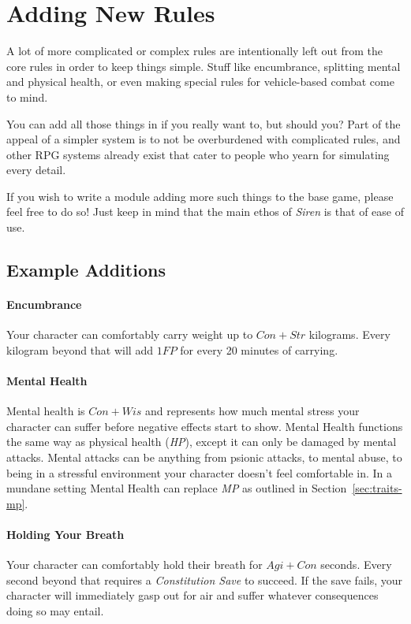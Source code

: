\section{Adding New Rules}\label{sec:hacking-rules}
A lot of more complicated or complex rules are intentionally left out from the core rules in order to keep things simple.
Stuff like encumbrance, splitting mental and physical health, or even making special rules for vehicle-based combat come to mind.

You can add all those things in if you really want to, but should you?
Part of the appeal of a simpler system is to not be overburdened with complicated rules, and other RPG systems already exist that cater to people who yearn for simulating every detail.

If you wish to write a module adding more such things to the base game, please feel free to do so! Just keep in mind that the main ethos of \textit{Siren} is that of ease of use.

\subsection{Example Additions}

\paragraph{Encumbrance} Your character can comfortably carry weight up to $Con + Str$ kilograms. 
Every kilogram beyond that will add $1\mathit{FP}$ for every 20 minutes of carrying.

\paragraph{Mental Health} Mental health is $Con + Wis$ and represents how much mental stress your character can suffer before negative effects start to show.
Mental Health functions the same way as physical health (\textit{HP}), except it can only be damaged by mental attacks.
Mental attacks can be anything from psionic attacks, to mental abuse, to being in a stressful environment your character doesn't feel comfortable in.
In a mundane setting Mental Health can replace \textit{MP} as outlined in Section~\ref{sec:traits-mp}.

\paragraph{Holding Your Breath} Your character can comfortably hold their breath for $Agi + Con$ seconds.
Every second beyond that requires a \textit{Constitution Save} to succeed.
If the save fails, your character will immediately gasp out for air and suffer whatever consequences doing so may entail.
